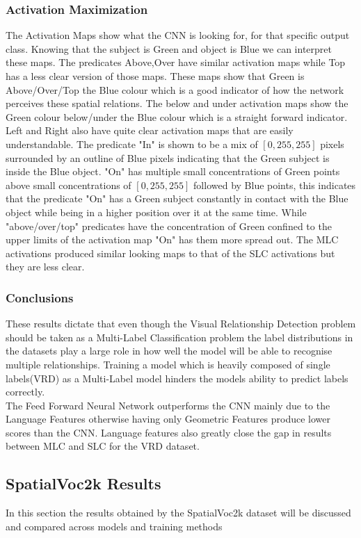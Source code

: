 \documentclass{csfyp}
\begin{document}
\subsubsection{Activation Maximization}
The Activation Maps show what the CNN is looking for, for that specific output class. Knowing that the subject is Green and object is Blue we can interpret these maps. The predicates Above,Over have similar activation maps while Top has a less clear version of those maps. These maps show that Green is Above/Over/Top the Blue colour which is a good indicator of how the network perceives these spatial relations. The below and under activation maps show the Green colour below/under the Blue colour which is a straight forward indicator. Left and Right also have quite clear activation maps that are easily understandable. The predicate "In" is shown to be a mix of $[0,255,255]$ pixels surrounded by an outline of Blue pixels indicating that the Green subject is inside the Blue object. "On" has multiple small concentrations  of Green points above small concentrations of $[0,255,255]$ followed by Blue points, this indicates that the predicate "On" has a Green subject constantly in contact with the Blue object while being in a higher position over it at the same time. While "above/over/top" predicates have the concentration of Green confined to the upper limits of the activation map "On" has them more spread out. The MLC activations produced similar looking maps to that of the SLC activations but they are less clear.


\subsubsection{Conclusions}
These results dictate that even though the Visual Relationship Detection problem should be taken as a Multi-Label Classification problem the label distributions in the datasets play a large role in how well the model will be able to recognise multiple relationships. Training a model which is heavily composed of single labels(VRD) as a Multi-Label model hinders the models ability to predict labels correctly.
\\
The Feed Forward Neural Network outperforms the CNN mainly due to the Language Features otherwise having only Geometric Features produce lower scores than the CNN. Language features also greatly close the gap in results between MLC and SLC for the VRD dataset. 

\subsection{SpatialVoc2k Results}
In this section the results obtained by the SpatialVoc2k dataset will be discussed and compared across models and training methods
\end{document}
